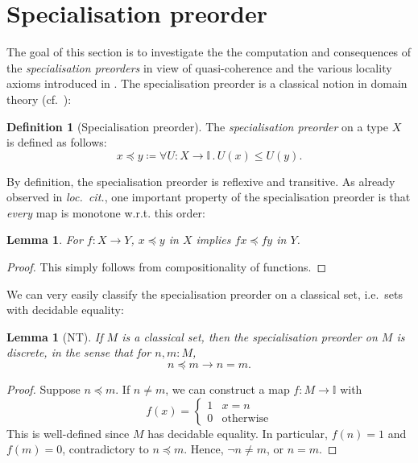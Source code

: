 \documentclass[a4paper,12pt]{amsart}
\newtheorem{lemma}[theorem]{Lemma}
\theoremstyle{definition}
\newtheorem{definition}[theorem]{Definition}
\newcommand{\mbb}[1]{\mathbb{#1}}
\newcommand{\I}{\mbb I}
\newcommand{\other}{\mathrm{otherwise}}
\newcommand{\fa}[2]{\forall #1\!\colon\!\!#2\mathpunct{.}}
\begin{document}
\section{Specialisation preorder}\label{sec:intposet}

The goal of this section is to investigate the the computation and consequences of the \emph{specialisation preorders} in view of quasi-coherence and the various locality axioms introduced in . The specialisation preorder is a classical notion in domain theory (cf.~\cite{PhoaWesleyKym-Son1991DtiR,hyland1990first}):

\begin{definition}[Specialisation preorder]\label{defn:specialisation}
  The \emph{specialisation preorder} on a type $X$ is defined as follows:
  \[ x \preceq y \coloneq \fa{U}{X\to\I} U(x) \le U(y). \]
\end{definition}

By definition, the specialisation preorder is reflexive and transitive. As already observed in \emph{loc.\ cit.}, one important property of the specialisation preorder is that \emph{every} map is monotone w.r.t. this order:

\begin{lemma}\label{lem:anymapmonotoneintriscorder}
  For $f \colon X \to Y$, $x \preceq y$ in $X$ implies $fx \preceq fy$ in $Y$.
\end{lemma}
\begin{proof}
  This simply follows from compositionality of functions.
\end{proof}

We can very easily classify the specialisation preorder on a classical set, i.e.\ sets with decidable equality:

\begin{lemma}[NT]\label{lem:discretephoa}
  If $M$ is a classical set, then the specialisation preorder on $M$ is discrete, in the sense that for $n,m : M$,
  \[ n \preceq m \to n = m. \]
\end{lemma}
\begin{proof}
  Suppose $n \preceq m$. If $n \neq m$, we can construct a map $f \colon M \to \I$ with 
  \[ f(x) =
  \begin{cases}
    1 & x = n \\ 
    0 & \other
  \end{cases}
  \]
  This is well-defined since $M$ has decidable equality. In particular, $f(n) = 1$ and $f(m) = 0$, contradictory to $n \preceq m$. Hence, $\neg n \neq m$, or $n = m$.
\end{proof}
\end{document}

